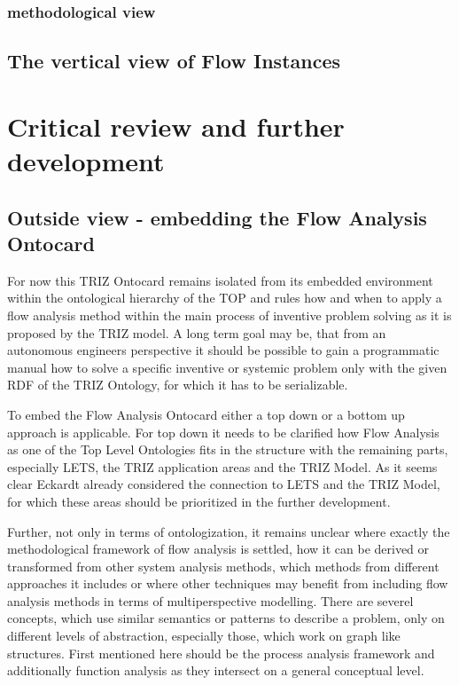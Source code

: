 \documentclass[a4paper,11pt]{article}
\begin{document}
            \subsubsection{methodological view}
        \subsection{The vertical view of Flow Instances}
    \section{Critical review and further development}
        \subsection{Outside view - embedding the Flow Analysis Ontocard}
        For now this TRIZ Ontocard remains isolated from its embedded environment within the ontological hierarchy of the TOP and rules how and when to 
        apply a flow analysis method within the main process of inventive problem solving as it is proposed by the TRIZ model. A long term goal may be,
        that from an autonomous engineers perspective it should be possible to gain a programmatic manual how to solve a specific inventive or systemic
        problem only with the given RDF of the TRIZ Ontology, for which it has to be serializable.

        To embed the Flow Analysis Ontocard either a top down or a bottom up approach is applicable. For top down it needs to be clarified how
        Flow Analysis as one of the Top Level Ontologies fits in the structure with the remaining parts, especially LETS, the TRIZ application areas and
        the TRIZ Model. As it seems clear Eckardt already considered the connection to LETS and the TRIZ Model, for which these areas should be prioritized
        in the further development.
        
        Further, not only in terms of ontologization, it remains unclear where exactly the methodological framework of flow
        analysis is settled, how it can be derived or transformed from other system analysis methods, which methods from different approaches it includes
        or where other techniques may benefit from including flow analysis methods in terms of multiperspective modelling. There are severel concepts, 
        which use similar semantics or patterns to describe a problem, only on different levels of abstraction, especially those, which work on graph
        like structures. First mentioned here should be the process analysis framework and additionally function analysis as they intersect on a general
        conceptual level.
\end{document}
